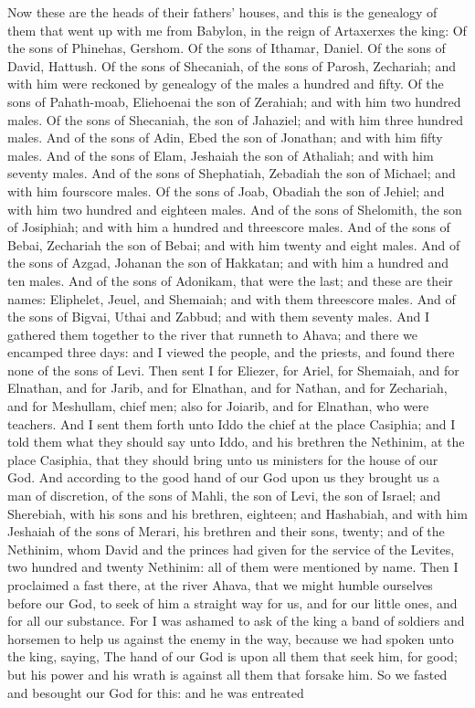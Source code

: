Now these are the heads of their fathers’ houses, and this is the genealogy of them that went up with me from Babylon, in the reign of Artaxerxes the king: Of the sons of Phinehas, Gershom. Of the sons of Ithamar, Daniel. Of the sons of David, Hattush. Of the sons of Shecaniah, of the sons of Parosh, Zechariah; and with him were reckoned by genealogy of the males a hundred and fifty. Of the sons of Pahath-moab, Eliehoenai the son of Zerahiah; and with him two hundred males. Of the sons of Shecaniah, the son of Jahaziel; and with him three hundred males. And of the sons of Adin, Ebed the son of Jonathan; and with him fifty males. And of the sons of Elam, Jeshaiah the son of Athaliah; and with him seventy males. And of the sons of Shephatiah, Zebadiah the son of Michael; and with him fourscore males. Of the sons of Joab, Obadiah the son of Jehiel; and with him two hundred and eighteen males. And of the sons of Shelomith, the son of Josiphiah; and with him a hundred and threescore males. And of the sons of Bebai, Zechariah the son of Bebai; and with him twenty and eight males. And of the sons of Azgad, Johanan the son of Hakkatan; and with him a hundred and ten males. And of the sons of Adonikam, that were the last; and these are their names: Eliphelet, Jeuel, and Shemaiah; and with them threescore males. And of the sons of Bigvai, Uthai and Zabbud; and with them seventy males.  And I gathered them together to the river that runneth to Ahava; and there we encamped three days: and I viewed the people, and the priests, and found there none of the sons of Levi. Then sent I for Eliezer, for Ariel, for Shemaiah, and for Elnathan, and for Jarib, and for Elnathan, and for Nathan, and for Zechariah, and for Meshullam, chief men; also for Joiarib, and for Elnathan, who were teachers. And I sent them forth unto Iddo the chief at the place Casiphia; and I told them what they should say unto Iddo, and his brethren the Nethinim, at the place Casiphia, that they should bring unto us ministers for the house of our God. And according to the good hand of our God upon us they brought us a man of discretion, of the sons of Mahli, the son of Levi, the son of Israel; and Sherebiah, with his sons and his brethren, eighteen; and Hashabiah, and with him Jeshaiah of the sons of Merari, his brethren and their sons, twenty; and of the Nethinim, whom David and the princes had given for the service of the Levites, two hundred and twenty Nethinim: all of them were mentioned by name.  Then I proclaimed a fast there, at the river Ahava, that we might humble ourselves before our God, to seek of him a straight way for us, and for our little ones, and for all our substance. For I was ashamed to ask of the king a band of soldiers and horsemen to help us against the enemy in the way, because we had spoken unto the king, saying, The hand of our God is upon all them that seek him, for good; but his power and his wrath is against all them that forsake him. So we fasted and besought our God for this: and he was entreated 